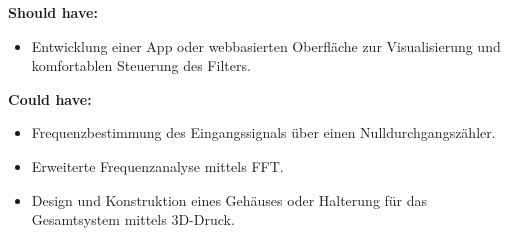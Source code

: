 \textbf{Should have:}
\begin{itemize}
    \item Entwicklung einer App oder webbasierten Oberfläche zur Visualisierung und komfortablen Steuerung des Filters.
\end{itemize}


\textbf{Could have:}
\begin{itemize}
    \item Frequenzbestimmung des Eingangssignals über einen Nulldurchgangszähler.
    \item Erweiterte Frequenzanalyse mittels FFT.
    \item Design und Konstruktion eines Gehäuses oder Halterung für das Gesamtsystem mittels 3D-Druck.
\end{itemize}












%
